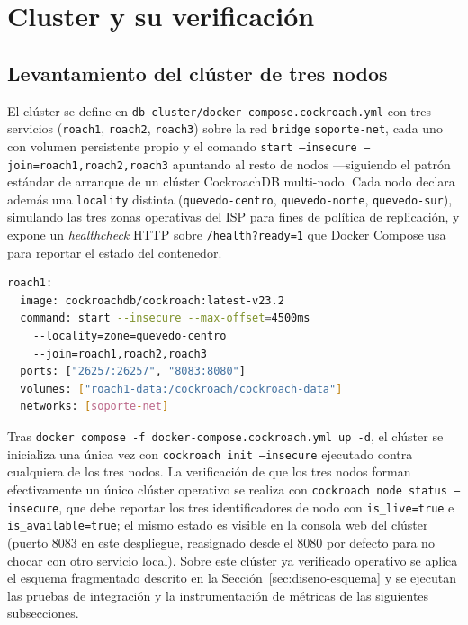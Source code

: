 \section{Cluster y su verificación}
\label{sec:cluster-verificacion}

\subsection{Levantamiento del clúster de tres nodos}

El clúster se define en \texttt{db-cluster/docker-compose.cockroach.yml} con tres servicios
(\texttt{roach1}, \texttt{roach2}, \texttt{roach3}) sobre la red \texttt{bridge}
\texttt{soporte-net}, cada uno con volumen persistente propio y el comando
\texttt{start --insecure --join=roach1,roach2,roach3} apuntando al resto de nodos —siguiendo el
patrón estándar de arranque de un clúster CockroachDB multi-nodo. Cada nodo declara además una
\texttt{locality} distinta (\texttt{quevedo-centro}, \texttt{quevedo-norte},
\texttt{quevedo-sur}), simulando las tres zonas operativas del ISP para fines de política de
replicación, y expone un \emph{healthcheck} HTTP sobre \texttt{/health?ready=1} que Docker Compose
usa para reportar el estado del contenedor.

\begin{lstlisting}[language=bash, caption={Extracto de \texttt{docker-compose.cockroach.yml}: definición de un nodo}, label={lst:compose-crdb}]
roach1:
  image: cockroachdb/cockroach:latest-v23.2
  command: start --insecure --max-offset=4500ms
    --locality=zone=quevedo-centro
    --join=roach1,roach2,roach3
  ports: ["26257:26257", "8083:8080"]
  volumes: ["roach1-data:/cockroach/cockroach-data"]
  networks: [soporte-net]
\end{lstlisting}

Tras \texttt{docker compose -f docker-compose.cockroach.yml up -d}, el clúster se inicializa una
única vez con \texttt{cockroach init --insecure} ejecutado contra cualquiera de los tres nodos.
La verificación de que los tres nodos forman efectivamente un único clúster operativo se realiza
con \texttt{cockroach node status --insecure}, que debe reportar los tres identificadores de nodo
con \texttt{is\_live=true} e \texttt{is\_available=true}; el mismo estado es visible en la consola
web del clúster (puerto 8083 en este despliegue, reasignado desde el 8080 por defecto para no
chocar con otro servicio local). Sobre este clúster ya verificado operativo se aplica el esquema
fragmentado descrito en la Sección~\ref{sec:diseno-esquema} y se ejecutan las pruebas de
integración y la instrumentación de métricas de las siguientes subsecciones.

